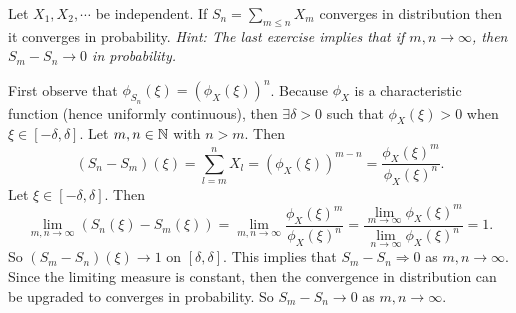 \begin{problem}
	Let $ X_1,X_2,\cdots $ be independent. If $ S_n = \sum_{m\leq n}X_m $ converges in distribution then it converges in probability. \emph{Hint: The last exercise implies that if $ m,n \to \infty $, then $ S_m - S_n \to 0 $ in probability.}
\end{problem}
\begin{solution}
	First observe that $ \phi_{S_n}(\xi) = (\phi_X(\xi))^n $. Because $ \phi_{X} $ is a characteristic function (hence uniformly continuous), then $ \exists \delta>0 $ such that $ \phi_X(\xi) > 0 $ when $ \xi \in [-\delta, \delta] $. Let $ m,n\in \mathbb{N} $ with $ n > m $. Then
	\[ (S_n - S_m)(\xi) = \sum_{l=m}^{n}X_l = (\phi_X(\xi))^{m-n} = \frac{\phi_X(\xi)^m}{\phi_X(\xi)^n}. \] 
	Let $ \xi \in [-\delta, \delta] $. Then
	\[ \lim_{m,n\to\infty}(S_n(\xi) - S_m(\xi)) =  \lim_{m,n\to\infty}\frac{\phi_X(\xi)^m}{\phi_X(\xi)^n} = \frac{\lim_{m\to\infty}\phi_X(\xi)^m}{\lim_{n\to\infty}\phi_X(\xi)^n} = 1.  \]
	So $ (S_m - S_n)(\xi) \to 1 $ on $ [\delta, \delta] $. This implies that $ S_m - S_n \Rightarrow 0 $ as $ m,n\to\infty $. Since the limiting measure is constant, then the convergence in distribution can be upgraded to converges in probability. So $ S_m - S_n \to 0 $ as $ m,n \to \infty $.
\end{solution}

